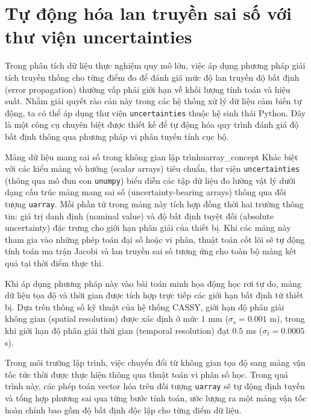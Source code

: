 \section{Tự động hóa lan truyền sai số với thư viện uncertainties}
\label{sec:python_uncertainties}

Trong phân tích dữ liệu thực nghiệm quy mô lớn, việc áp dụng phương pháp giải tích truyền thống cho từng điểm đo để đánh giá mức độ lan truyền độ bất định (error propagation) thường vấp phải giới hạn về khối lượng tính toán và hiệu suất. Nhằm giải quyết rào cản này trong các hệ thống xử lý dữ liệu cảm biến tự động, ta có thể áp dụng thư viện \texttt{uncertainties} thuộc hệ sinh thái Python. Đây là một công cụ chuyên biệt được thiết kế để tự động hóa quy trình đánh giá độ bất định thông qua phương pháp vi phân tuyến tính cục bộ.

\begin{physcore}{Mảng dữ liệu mang sai số trong không gian lập trình}{uarray_concept}
Khác biệt với các kiểu mảng vô hướng (scalar arrays) tiêu chuẩn, thư viện \texttt{uncertainties} (thông qua mô đun con \texttt{unumpy}) biểu diễn các tập dữ liệu đo lường vật lý dưới dạng cấu trúc mảng mang sai số (uncertainty-bearing arrays) thông qua đối tượng \texttt{uarray}. Mỗi phần tử trong mảng này tích hợp đồng thời hai trường thông tin: giá trị danh định (nominal value) và độ bất định tuyệt đối (absolute uncertainty) đặc trưng cho giới hạn phân giải của thiết bị. Khi các mảng này tham gia vào những phép toán đại số hoặc vi phân, thuật toán cốt lõi sẽ tự động tính toán ma trận Jacobi và lan truyền sai số tương ứng cho toàn bộ mảng kết quả tại thời điểm thực thi.
\end{physcore}

Khi áp dụng phương pháp này vào bài toán minh họa động học rơi tự do, mảng dữ liệu tọa độ và thời gian được tích hợp trực tiếp các giới hạn bất định từ thiết bị. Dựa trên thông số kỹ thuật của hệ thống CASSY, giới hạn độ phân giải không gian (spatial resolution) được xác định ở mức $1$ mm ($\sigma_s = 0.001$ m), trong khi giới hạn độ phân giải thời gian (temporal resolution) đạt $0.5$ ms ($\sigma_t = 0.0005$ s).

Trong môi trường lập trình, việc chuyển đổi từ không gian tọa độ sang mảng vận tốc tức thời được thực hiện thông qua thuật toán vi phân số học. Trong quá trình này, các phép toán vector hóa trên đối tượng \texttt{uarray} sẽ tự động định tuyến và tổng hợp phương sai qua từng bước tính toán, ước lượng ra một mảng vận tốc hoàn chỉnh bao gồm độ bất định độc lập cho từng điểm dữ liệu.


